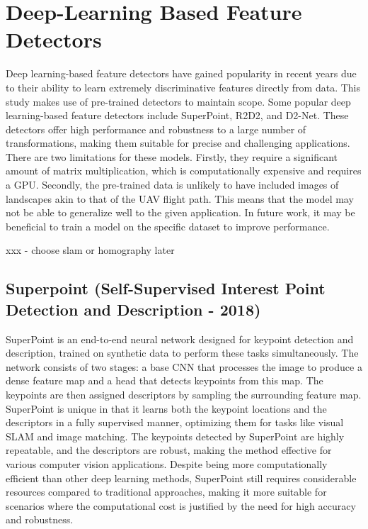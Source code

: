 \section*{Deep-Learning Based Feature Detectors}

Deep learning-based feature detectors have gained popularity in recent years due to their ability to learn extremely discriminative features directly from data. This study makes use of pre-trained detectors to maintain scope. Some popular deep learning-based feature detectors include SuperPoint, R2D2, and D2-Net. These detectors offer high performance and robustness to a large number of transformations, making them suitable for precise and challenging applications. 
There are two limitations for these models. Firstly, they require a significant amount of matrix multiplication, which is computationally expensive and requires a GPU. Secondly, the pre-trained data is unlikely to have included images of landscapes akin to that of the UAV flight path. This means that the model may not be able to generalize well to the given application. In future work, it may be beneficial to train a model on the specific dataset to improve performance.

xxx - choose slam or homography later
\subsection*{Superpoint (Self-Supervised Interest Point Detection and Description - 2018)}
SuperPoint is an end-to-end neural network designed for keypoint detection and description, trained on synthetic data to perform these tasks simultaneously. The network consists of two stages: a base CNN that processes the image to produce a dense feature map and a head that detects keypoints from this map. The keypoints are then assigned descriptors by sampling the surrounding feature map. SuperPoint is unique in that it learns both the keypoint locations and the descriptors in a fully supervised manner, optimizing them for tasks like visual SLAM and image matching. The keypoints detected by SuperPoint are highly repeatable, and the descriptors are robust, making the method effective for various computer vision applications. Despite being more computationally efficient than other deep learning methods, SuperPoint still requires considerable resources compared to traditional approaches, making it more suitable for scenarios where the computational cost is justified by the need for high accuracy and robustness.


